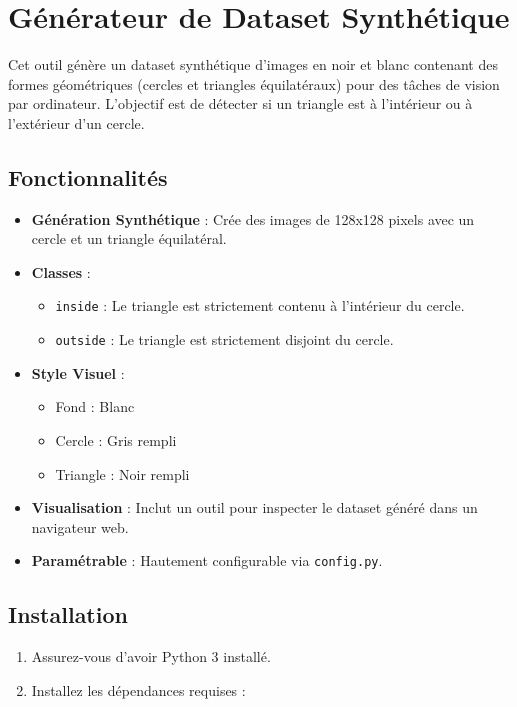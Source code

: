 \chapter{G\'en\'erateur de Dataset Synth\'etique} \label{ch_dataset}

Cet outil g\'en\`ere un dataset synth\'etique d'images en noir et blanc contenant des formes g\'eom\'etriques (cercles et triangles \'equilat\'eraux) pour des t\^aches de vision par ordinateur. L'objectif est de d\'etecter si un triangle est \`a l'int\'erieur ou \`a l'ext\'erieur d'un cercle.

\section{Fonctionnalit\'es}

\begin{itemize}
    \item \textbf{G\'en\'eration Synth\'etique} : Cr\'ee des images de 128x128 pixels avec un cercle et un triangle \'equilat\'eral.
    \item \textbf{Classes} :
    \begin{itemize}
        \item \texttt{inside} : Le triangle est strictement contenu \`a l'int\'erieur du cercle.
        \item \texttt{outside} : Le triangle est strictement disjoint du cercle.
    \end{itemize}
    \item \textbf{Style Visuel} :
    \begin{itemize}
        \item Fond : Blanc
        \item Cercle : Gris rempli
        \item Triangle : Noir rempli
    \end{itemize}
    \item \textbf{Visualisation} : Inclut un outil pour inspecter le dataset g\'en\'er\'e dans un navigateur web.
    \item \textbf{Param\'etrable} : Hautement configurable via \texttt{config.py}.
\end{itemize}

\section{Installation}

\begin{enumerate}
    \item Assurez-vous d'avoir Python 3 install\'e.
    \item Installez les d\'ependances requises :
\end{enumerate}

